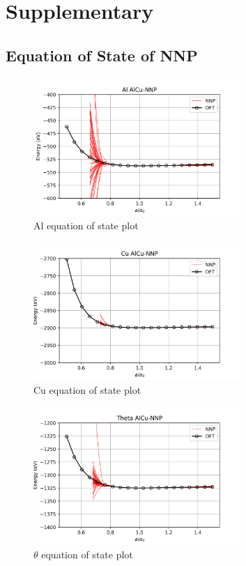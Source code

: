 \documentclass{article}
\begin{document}
\newpage
  

\newpage
\appendix
\section{Supplementary}
\subsection{Equation of State of NNP} \label{sct:eos_data}

\begin{figure}[H]%
\centering%
\includegraphics[width=0.7\textwidth,center]{figures/EOS_AlCu-NNP_Al.png}%
\caption{Al equation of state plot}%
\end{figure}

\begin{figure}[H]%
\centering%
\includegraphics[width=0.7\textwidth,center]{figures/EOS_AlCu-NNP_Cu.png}%
\caption{Cu equation of state plot}%
\end{figure}

\begin{figure}[H]%
\centering%
\includegraphics[width=0.7\textwidth,center]{figures/EOS_AlCu-NNP_Theta.png}%
\caption{$\theta$ equation of state plot}%
\end{figure}
\end{document}
